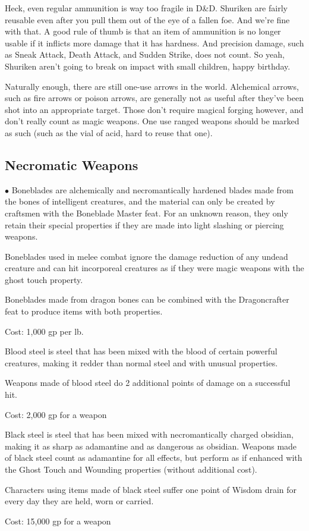 Heck, even regular ammunition is way too fragile in D\&D. Shuriken are fairly reusable even after you pull them out of the eye of a fallen foe. And we're fine with that. A good rule of thumb is that an item of ammunition is no longer usable if it inflicts more damage that it has hardness. And precision damage, such as Sneak Attack, Death Attack, and Sudden Strike, does not count. So yeah, Shuriken aren't going to break on impact with small children, happy birthday.

Naturally enough, there are still one-use arrows in the world. Alchemical arrows, such as fire arrows or poison arrows, are generally not as useful after they've been shot into an appropriate target. Those don't require magical forging however, and don't really count as magic weapons. One use ranged weapons should be marked as such (such as the vial of acid, hard to reuse that one).

\subsection{Necromatic Weapons}

\begin{list}{$\bullet$}{\itemspace}
 Boneblades are alchemically and necromantically hardened blades made from the bones of intelligent creatures, and the material can only be created by craftsmen with the Boneblade Master feat. For an unknown reason, they only retain their special properties if they are made into light slashing or piercing weapons.

Boneblades used in melee combat ignore the damage reduction of any undead creature and can hit incorporeal creatures as if they were magic weapons with the ghost touch property.

Boneblades made from dragon bones can be combined with the Dragoncrafter feat to produce items with both properties.

Cost: 1,000 gp per lb.

 Blood steel is steel that has been mixed with the blood of certain powerful creatures, making it redder than normal steel and with unusual properties.

Weapons made of blood steel do 2 additional points of damage on a successful hit.

Cost: 2,000 gp for a weapon

 Black steel is steel that has been mixed with necromantically charged obsidian, making it as sharp as adamantine and as dangerous as obsidian. Weapons made of black steel count as adamantine for all effects, but perform as if enhanced with the Ghost Touch and Wounding properties (without additional cost).

Characters using items made of black steel suffer one point of Wisdom drain for every day they are held, worn or carried.

Cost: 15,000 gp for a weapon  %

\end{list} 

